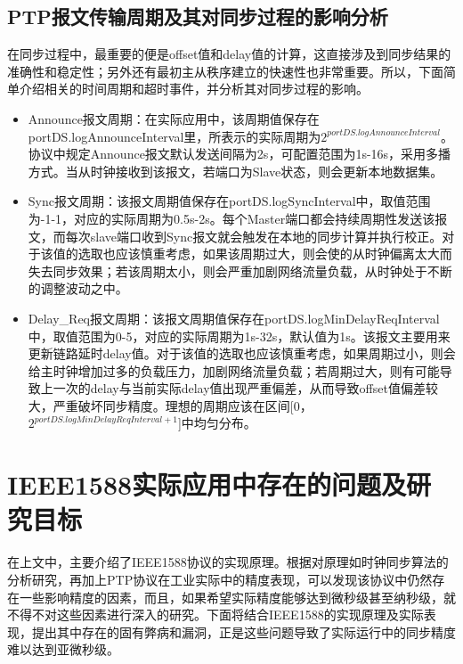 \subsection{PTP报文传输周期及其对同步过程的影响分析}
在同步过程中，最重要的便是offset值和delay值的计算，这直接涉及到同步结果的准确性和稳定性；另外还有最初主从秩序建立的快速性也非常重要。所以，下面简单介绍相关的时间周期和超时事件，并分析其对同步过程的影响。
\begin{itemize}[noitemsep,topsep=0pt,parsep=0pt,partopsep=0pt]
	\item Announce报文周期：在实际应用中，该周期值保存在portDS.logAnnounceInterval里，所表示的实际周期为$2^{portDS.logAnnounceInterval}$。协议中规定Announce报文默认发送间隔为2s，可配置范围为1s-16s，采用多播方式。当从时钟接收到该报文，若端口为Slave状态，则会更新本地数据集。
	\item Sync报文周期：该报文周期值保存在portDS.logSyncInterval中，取值范围为-1-1，对应的实际周期为0.5s-2s。每个Master端口都会持续周期性发送该报文，而每次slave端口收到Sync报文就会触发在本地的同步计算并执行校正。对于该值的选取也应该慎重考虑，如果该周期过大，则会使的从时钟偏离太大而失去同步效果；若该周期太小，则会严重加剧网络流量负载，从时钟处于不断的调整波动之中。
	\item Delay\_Req报文周期：该报文周期值保存在portDS.logMinDelayReqInterval中，取值范围为0-5，对应的实际周期为1s-32s，默认值为1s。该报文主要用来更新链路延时delay值。对于该值的选取也应该慎重考虑，如果周期过小，则会给主时钟增加过多的负载压力，加剧网络流量负载；若周期过大，则有可能导致上一次的delay与当前实际delay值出现严重偏差，从而导致offset值偏差较大，严重破坏同步精度。理想的周期应该在区间[0， $2^{portDS.logMinDelayReqInterval+1}$]中均匀分布。
\end{itemize}

\section{IEEE1588实际应用中存在的问题及研究目标}
在上文中，主要介绍了IEEE1588协议的实现原理。根据对原理如时钟同步算法的分析研究，再加上PTP协议在工业实际中的精度表现，可以发现该协议中仍然存在一些影响精度的因素，而且，如果希望实际精度能够达到微秒级甚至纳秒级，就不得不对这些因素进行深入的研究。下面将结合IEEE1588的实现原理及实际表现，提出其中存在的固有弊病和漏洞，正是这些问题导致了实际运行中的同步精度难以达到亚微秒级。

